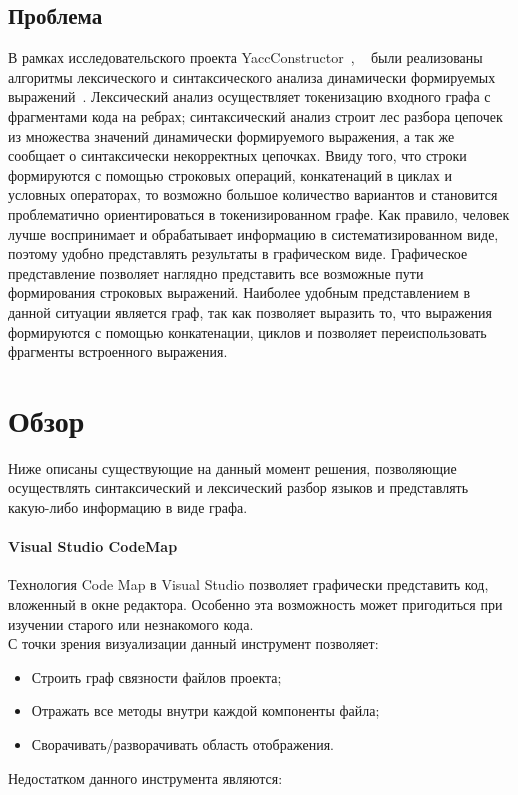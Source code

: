 \documentclass{matmex-diploma}
\begin{document}
\subsection*{Проблема}
В рамках исследовательского проекта YaccConstructor~\cite{wiki:YC}, ~\cite{wiki:YCPap} были реализованы алгоритмы лексического и синтаксического анализа динамически формируемых выражений~\cite{book:expression}. Лексический анализ осуществляет токенизацию входного графа с фрагментами кода на ребрах; синтаксический анализ строит лес разбора цепочек из множества значений динамически формируемого выражения, а так же сообщает о синтаксически некорректных цепочках. Ввиду того, что строки формируются с помощью строковых операций, конкатенаций в циклах и условных операторах, то возможно большое количество вариантов и становится проблематично ориентироваться в токенизированном графе. Как правило, человек лучше воспринимает и обрабатывает информацию в систематизированном виде, поэтому удобно представлять результаты в графическом виде. Графическое представление позволяет наглядно представить все возможные пути формирования строковых выражений. Наиболее удобным представлением в данной ситуации является граф, так как позволяет выразить то, что выражения формируются с помощью конкатенации, циклов и позволяет переиспользовать фрагменты встроенного выражения.

\section{Обзор}
Ниже описаны существующие на данный момент решения, позволяющие осуществлять синтаксический и лексический разбор языков и представлять какую-либо информацию в виде графа.
\paragraph {Visual Studio CodeMap}
Технология Code Map в Visual Studio позволяет графически представить код, вложенный в окне редактора. Особенно эта возможность может пригодиться при изучении старого или незнакомого кода. \\
С точки зрения визуализации данный инструмент позволяет:

\begin{itemize}

        \item { Строить граф связности файлов проекта;}
        \item { Отражать все методы внутри каждой компоненты файла; }
        \item { Сворачивать/разворачивать область отображения. }
        
 \end{itemize}
Недостатком данного инструмента являются:
\end{document}
